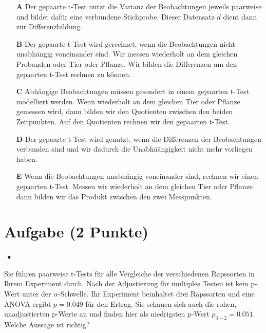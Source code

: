 \documentclass[a4paper, 9pt]{scrartcl}\usepackage[]{graphicx}\usepackage[]{xcolor}
\begin{document}
\begin{enumerate}
\item [\textbf{A} \msquare] Der gepaarte t-Test nutzt die Varianz der Beobachtungen jeweils paarweise und bildet dafür eine verbundene Stichprobe. Dieser Datensatz $d$ dient dann zur Differenzbildung.
\item [\textbf{B} \msquare] Der gepaarte t-Test wird gerechnet, wenn die Beobachtungen nicht unabhängig voneinander sind. Wir messen wiederholt an dem gleichen Probanden oder Tier oder Pflanze. Wir bilden die Differenzen um den gepaarten t-Test rechnen zu können.
\item [\textbf{C} \msquare] Abhängige Beobachtungen müssen gesondert in einem gepaarten t-Test modelliert werden. Wenn wiederholt an dem gleichen Tier oder Pflanze gemessen wird, dann bilden wir den Quotienten zwischen den beiden Zeitpunkten. Auf den Quotienten rechnen wir den gepaarten t-Test.
\item [\textbf{D} \msquare] Der gepaarte t-Test wird genutzt, wenn die Differenzen der Beobachtungen verbunden sind und wir dadurch die Unabhäängigkeit nicht mehr vorliegen haben.
\item [\textbf{E} \msquare] Wenn die Beobachtungen unabhängig voneinander sind, rechnen wir einen gepaarten t-Test. Messen wir wiederholt an dem gleichen Tier oder Pflanze dann bilden wir das Produkt zwischen den zwei Messpunkten.
\end{enumerate}

\section{Aufgabe \hfill (2 Punkte)}

\ifcollection
\begin{flushright}
\tiny\vspace{-2Ex}
\textbf{\examinhaltstart}
\exammodulestatversuch $\;\bullet$
\exammodulebiostat
\vspace{-1Ex}
\end{flushright}
\fi




Sie führen paarweise t-Tests für alle Vergleiche der verschiedenen Rapssorten in Ihrem Experiment durch. Nach der Adjustierung für multiples Testen ist kein p-Wert unter der $\alpha$-Schwelle. Ihr Experiment beinhaltet drei Rapssorten und eine ANOVA ergibt $p = 0.049$ für den Ertrag. Sie schauen sich auch die rohen, unadjustierten p-Werte an und finden hier als niedrigsten p-Wert $p_{3-2} = 0.051$. Welche Aussage ist richtig?
\end{document}
